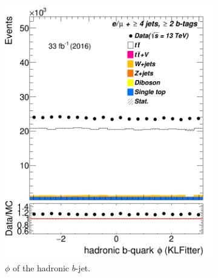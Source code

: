 \begin{figure} %
	\centering
	
	
	



	\begin{subfigure}{0.25\textwidth}
		\includegraphics[width=\linewidth]{ControlPlots_emujets_2016_4incl_2incl/klf_bhad_phi_emujets_2016.png}
		\caption{$\phi$ of the hadronic $b$-jet.} \label{fig:K30}
	\end{subfigure}\hspace*{0.5cm}
	\begin{subfigure}{0.25\textwidth}

\end{subfigure}
\end{figure}
